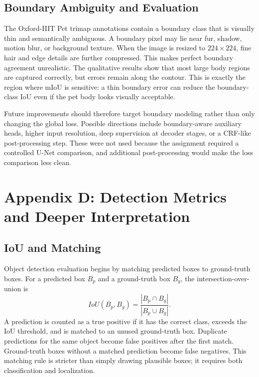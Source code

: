 \documentclass[10pt,twocolumn]{article}
\begin{document}
\subsection{Boundary Ambiguity and Evaluation}

The Oxford-IIIT Pet trimap annotations contain a boundary class that is visually thin and semantically ambiguous. A boundary pixel may lie near fur, shadow, motion blur, or background texture. When the image is resized to $224 \times 224$, fine hair and edge details are further compressed. This makes perfect boundary agreement unrealistic. The qualitative results show that most large body regions are captured correctly, but errors remain along the contour. This is exactly the region where mIoU is sensitive: a thin boundary error can reduce the boundary-class IoU even if the pet body looks visually acceptable.

Future improvements should therefore target boundary modeling rather than only changing the global loss. Possible directions include boundary-aware auxiliary heads, higher input resolution, deep supervision at decoder stages, or a CRF-like post-processing step. These were not used because the assignment required a controlled U-Net comparison, and additional post-processing would make the loss comparison less clean.

\section{Appendix D: Detection Metrics and Deeper Interpretation}

\subsection{IoU and Matching}

Object detection evaluation begins by matching predicted boxes to ground-truth boxes. For a predicted box $B_p$ and a ground-truth box $B_g$, the intersection-over-union is
\begin{equation}
IoU(B_p,B_g)=\frac{|B_p\cap B_g|}{|B_p\cup B_g|}.
\end{equation}
A prediction is counted as a true positive if it has the correct class, exceeds the IoU threshold, and is matched to an unused ground-truth box. Duplicate predictions for the same object become false positives after the first match. Ground-truth boxes without a matched prediction become false negatives. This matching rule is stricter than simply drawing plausible boxes; it requires both classification and localization.
\end{document}
